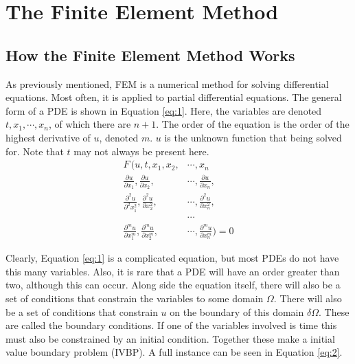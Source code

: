 
\pagebreak

\section{The Finite Element Method} \label{section:fem}

\subsection{How the Finite Element Method Works} \label{subsection:how-fem-works}

As previously mentioned, FEM is a numerical method for solving differential equations. Most often, it is applied to partial differential equations. The general form of a PDE is shown in Equation \ref{eq:1}. Here, the variables are denoted $t, x_1, \cdots, x_n$, of which there are $n+1$. The order of the equation is the order of the highest derivative of $u$, denoted $m$. $u$ is the unknown function that being solved for. Note that $t$ may not always be present here.
\begin{align}\label{eq:1}
F \, \Big(u, t, x_1, x_2, &\cdots, x_n \nonumber \\
\frac{\partial u}{\partial x_1}, \frac{\partial u}{\partial x_2}, &\cdots, \frac{\partial u}{\partial x_n}, \nonumber \\ 
\frac{\partial^2 u}{\partial^2 x^2_1}, \frac{\partial^2 u}{\partial x^2_2}, &\cdots, \frac{\partial^2 u}{\partial x_n^2}, \\
&\cdots \nonumber \\
\frac{\partial^m u}{\partial x^m_1}, \frac{\partial^m u}{\partial x^m_2}, &\cdots, \frac{\partial^m u}{\partial x_n^m} \Big)= 0\nonumber
\end{align}

Clearly, Equation \ref{eq:1} is a complicated equation, but most PDEs do not have this many variables. Also, it is rare that a PDE will have an order greater than two, although this can occur. Along side the equation itself, there will also be a set of conditions that constrain the variables to some domain $\Omega$. There will also be a set of conditions that constrain $u$ on the boundary of this domain $\delta \Omega$. These are called the boundary conditions. If one of the variables involved is time this must also be constrained by an initial condition. Together these make a initial value boundary problem (IVBP). A full instance can be seen in Equation \ref{eq:2}.

